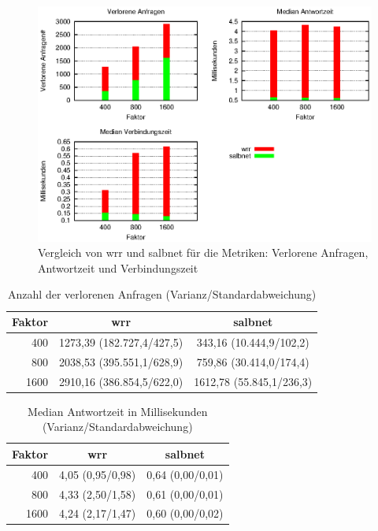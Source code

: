 \documentclass[a4paper, 12pt, BCOR10mm, DIV12, toc=bibliography, toc=listof, german]{scrbook}
\begin{document}
			\begin{figure}
				\centering
				\includegraphics[width=13cm]{plots/servload}
				\caption{Vergleich von wrr und salbnet für die Metriken: Verlorene Anfragen, Antwortzeit und	Verbindungszeit}
				\label{fig:ergebnis}
			\end{figure}

			\begin{table}
				\centering
				\begin{tabular}{|r|c|c|}\hline
					Faktor & wrr & salbnet \\\hline\hline
					400 & 1273,39 (182.727,4/427,5) & 343,16 (10.444,9/102,2)\\
					800 & 2038,53 (395.551,1/628,9) & 759,86 (30.414,0/174,4)\\
					1600 & 2910,16 (386.854,5/622,0) & 1612,78 (55.845,1/236,3)\\\hline
				\end{tabular}
				\caption{Anzahl der verlorenen Anfragen (Varianz/Standardabweichung)}
				\label{tab:timeout}
			\end{table}

			\begin{table}
				\centering
				\begin{tabular}{|r|c|c|}\hline
					Faktor & wrr & salbnet \\\hline\hline
					400 & 4,05 (0,95/0,98) & 0,64 (0,00/0,01)\\
					800 & 4,33 (2,50/1,58) & 0,61 (0,00/0,01)\\
					1600 & 4,24 (2,17/1,47) & 0,60 (0,00/0,02)\\\hline
				\end{tabular}
				\caption{Median Antwortzeit in Millisekunden (Varianz/Standardabweichung)}
				\label{tab:response}
			\end{table}
\end{document}
